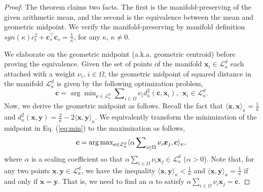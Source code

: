 \begin{proof}
The theorem claims two facts. The first  is the manifold-preserving of the given arithmetic mean, and the second is the equivalence between the mean and geometric midpoint.
We verify the manifold-preserving by manifold definition $sgn(\kappa)c_t^2+\boldsymbol c_s^\top\boldsymbol c_s=\frac{1}{\kappa}$, for any $\kappa$,
$\kappa \neq 0$.

We elaborate on the geometric midpoint (a.k.a. geometric centroid) before proving the equivalence.
Given the set of points of the manifold $\boldsymbol x_i \in \mathcal L_{\kappa }^{d}$ each attached with a weight $\nu_{i}$, $i \in \Omega$,
the geometric midpoint of squared distance in the manifold $\mathcal L_{\kappa }^{d}$  is given by the following optimization problem,
\vspace{-0.03in}
\begin{equation}
\boldsymbol c=\arg \min\nolimits_{\boldsymbol c \in \mathcal L_{\kappa }^{d}} \sum\nolimits_{i \in \Omega} \nu_{i} d^2_\kappa(\boldsymbol c, \boldsymbol x_i), \ \ \boldsymbol x_i \in \mathcal L_{\kappa }^{d}.
\label{eq:min}
\end{equation}
Now, we derive the geometric midpoint as follows.
Recall the fact that $\langle \boldsymbol{x}, \boldsymbol{x} \rangle_\kappa =\frac{1}{\kappa}$
and
$ d_{\kappa}^{2}\left(\boldsymbol{x}, \boldsymbol{y}\right) = \frac{2}{\kappa} - 2\langle \boldsymbol{x}, \boldsymbol{y} \rangle_\kappa$.
We equivalently transform the minimization of the midpoint in Eq. (\ref{eq:min}) to the maximization  as follows,
\vspace{-0.05in}
\begin{equation}
\boldsymbol c=\arg \max\nolimits_{\boldsymbol c \in \mathcal L_{\kappa }^{d}}   \langle \alpha \sum\nolimits_{i \in \Omega} \nu_{i}\boldsymbol{x}_{j}, \boldsymbol{c}\rangle_\kappa, \\
\end{equation}
where  $\alpha$ is a scaling coefficient so that $\alpha \sum\nolimits_{i \in \Omega} \nu_{i}\boldsymbol{x}_{j} \in \mathcal L_{\kappa }^{d}$ ($\alpha >0$). Note that, for any two points $\boldsymbol{x}, \boldsymbol{y} \in \mathcal L_{\kappa }^{d}$, 
we have the inequality 
$\langle \boldsymbol{x}, \boldsymbol{y} \rangle_\kappa< \frac{1}{\kappa}$
and $\langle \boldsymbol{x}, \boldsymbol{y} \rangle_\kappa = \frac{1}{\kappa}$ if and only if $\boldsymbol{x}=\boldsymbol{y}$.
That is, we need to find an $\alpha$ to satisfy 
$\alpha \sum\nolimits_{i \in \Omega} \nu_{i}\boldsymbol{x}_{j}= \boldsymbol{c}$. 

\end{proof}

